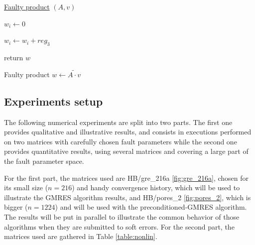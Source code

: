 \documentclass[twoside]{article}
\newcounter{fig}\setcounter{fig}{0}
\begin{document}
\begin{algorithm}
  
  \underline{Faulty product} $(A, v)$\;
  {
    $w_i \leftarrow 0$ \;
    {
      { 
        
        
        $w_i \leftarrow w_i + reg_3$ \;
      }

    }
  }
  return $w$\;
  \caption{Faulty product $w \leftarrow \widetilde{A \cdot v}$}\label{alg:faulty_product}
\end{algorithm}


\subsection{Experiments setup}
The following numerical experiments are split into two parts. The first one provides qualitative and illustrative results, and consists in executions performed on two matrices with carefully chosen fault parameters while the second one provides quantitative results, using several matrices and covering a large part of the fault parameter space. 


For the first part, the matrices used are HB/gre_216a \ref{fig:gre_216a}, chosen for its small size ($n=216$) and handy convergence history, which will be used to illustrate the GMRES algorithm results, and HB/pores_2 \ref{fig:pores_2}, which is bigger ($n=1224$) and will be used with the preconditioned-GMRES algorithm. The results will be put in parallel to illustrate the common behavior of those algorithms when they are submitted to soft errors. For the second part, the matrices used are gathered in Table \ref{table:nonlin}.
\end{document}
